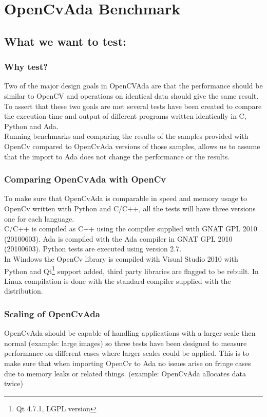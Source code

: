 \chapter{OpenCvAda Benchmark}
\section{What we want to test:}
\subsection{Why test?}
Two of the major design goals in OpenCVAda are that the performance should be similar to OpenCV and operations on identical data should give the same result. To assert that these two goals are met several tests have been created to compare the execution time and output of different programs written identically in C, Python and Ada. 
\\
Running benchmarks and comparing the results of the samples provided with OpenCv compared to OpenCvAda versions of those samples, allows us to assume that the import to Ada does not change the performance or the results.
\subsection{Comparing OpenCvAda with OpenCv}
To make sure that OpenCvAda is comparable in speed and memory usage to OpenCv written with Python and C/C++, all the tests will have three versions one for each language.
\\
C/C++ is compiled as C++ using the compiler supplied with GNAT GPL 2010 (20100603).
Ada is compiled with the Ada compiler in GNAT GPL 2010 (20100603).
Python tests are executed using version 2.7.
\\
In Windows the OpenCv library is compiled with Visual Studio 2010 with Python and Qt\footnote{Qt\cite{qtweb} 4.7.1, LGPL version} support added, third party libraries are flagged to be rebuilt.
In Linux compilation is done with the standard compiler supplied with the distribution.
\subsection{Scaling of OpenCvAda}
OpenCvAda should be capable of handling applications with a larger scale then normal (example: large images) so three tests have been designed to measure performance on different cases where larger scales could be applied. This is to make sure that when importing OpenCv to Ada no issues arise on fringe cases due to memory leaks or related things. (example: OpenCvAda allocates data twice)
